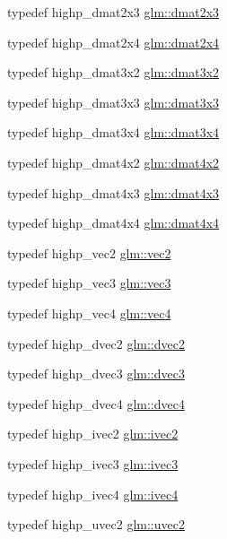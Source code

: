 \begin{CompactItemize}
typedef highp\_\-dmat2x3 \hyperlink{group__core__types_g6b5ff9888ca0e468f35b637d4c3a361d}{glm::dmat2x3}
\item 
typedef highp\_\-dmat2x4 \hyperlink{group__core__types_g2d1dd4b4925d1ea67539902c820483a0}{glm::dmat2x4}
\item 
typedef highp\_\-dmat3x2 \hyperlink{group__core__types_g2db259d2e7921065c5b7d4dca9547960}{glm::dmat3x2}
\item 
typedef highp\_\-dmat3x3 \hyperlink{group__core__types_gf3c29c4f75a448f308463e75ca2efd4c}{glm::dmat3x3}
\item 
typedef highp\_\-dmat3x4 \hyperlink{group__core__types_g19e745a83cba85f57afa1232276dcc96}{glm::dmat3x4}
\item 
typedef highp\_\-dmat4x2 \hyperlink{group__core__types_gb3d51ce41e6f0aa267d3e185cee09c44}{glm::dmat4x2}
\item 
typedef highp\_\-dmat4x3 \hyperlink{group__core__types_ga4a157ac183c5bd5dcbd555a94b1b505}{glm::dmat4x3}
\item 
typedef highp\_\-dmat4x4 \hyperlink{group__core__types_g54d90d4b902d93638b906571af215bb1}{glm::dmat4x4}
\item 
typedef highp\_\-vec2 \hyperlink{group__core__types_ga1618f51db67eaa145db101d8c8431d8}{glm::vec2}
\item 
typedef highp\_\-vec3 \hyperlink{group__core__types_g1c47e8b3386109bc992b6c48e91b0be7}{glm::vec3}
\item 
typedef highp\_\-vec4 \hyperlink{group__core__types_g5881b1b022d7fd1b7218f5916532dd02}{glm::vec4}
\item 
typedef highp\_\-dvec2 \hyperlink{group__core__types_ge6727259898288cae197724d5f172b3b}{glm::dvec2}
\item 
typedef highp\_\-dvec3 \hyperlink{group__core__types_g7f3287f952e6ccb481231368091702ac}{glm::dvec3}
\item 
typedef highp\_\-dvec4 \hyperlink{group__core__types_g0824ceed7ec3b2fba89765501c1540b5}{glm::dvec4}
\item 
typedef highp\_\-ivec2 \hyperlink{group__core__types_g9e6ce9cfc7919976b318197e18d8a065}{glm::ivec2}
\item 
typedef highp\_\-ivec3 \hyperlink{group__core__types_g6e12a4ca00d696f07da1df4eb73e0fe8}{glm::ivec3}
\item 
typedef highp\_\-ivec4 \hyperlink{group__core__types_ga4560ddc50320ea8f8a70d5c9c249fea}{glm::ivec4}
\item 
typedef highp\_\-uvec2 \hyperlink{group__core__types_gfd2041b45eff671aa8899d2c2835eee9}{glm::uvec2}

\end{CompactItemize}
